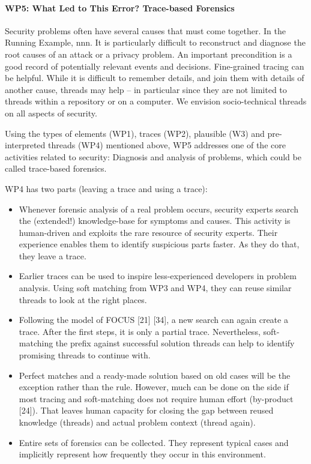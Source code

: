 \paragraph*{WP5: What Led to This Error? Trace-based Forensics}
Security problems often have several causes that must come together. In the Running Example, nnn.
It is particularly difficult to reconstruct and diagnose the root causes of an attack or a privacy problem. An important precondition is a good record of potentially relevant events and decisions. Fine-grained tracing can be helpful. While it is difficult to remember details, and join them with details of another cause, threads may help – in particular since they are not limited to threads within a repository or on a computer. We envision socio-technical threads on all aspects of security.

Using the types of elements (WP1), traces (WP2), plausible (W3) and pre-interpreted threads (WP4) mentioned above, WP5 addresses one of the core activities related to security: Diagnosis and analysis of problems, which could be called trace-based forensics.

WP4 has two parts (leaving a trace and using a trace):
\begin{itemize}
\item Whenever forensic analysis of a real problem occurs, security experts search the (extended!) knowledge-base for symptoms and causes. This activity is human-driven and exploits the rare resource of security experts. Their experience enables them to identify suspicious parts faster. As they do that, they leave a trace. 
\item Earlier traces can be used to inspire less-experienced developers in problem analysis. Using soft matching from WP3 and WP4, they can reuse similar threads to look at the right places.
\item Following the model of FOCUS [21] [34], a new search can again create a trace. After the first steps, it is only a partial trace. Nevertheless, soft-matching the prefix against successful solution threads can help to identify promising threads to continue with. 
\item Perfect matches and a ready-made solution based on old cases will be the exception rather than the rule. However, much can be done on the side if most tracing and soft-matching does not require human effort (by-product [24]). That leaves human capacity for closing the gap between reused knowledge (threads) and actual problem context (thread again).
\item Entire sets of forensics can be collected. They represent typical cases and implicitly represent how frequently they occur in this environment. 
\end{itemize}

